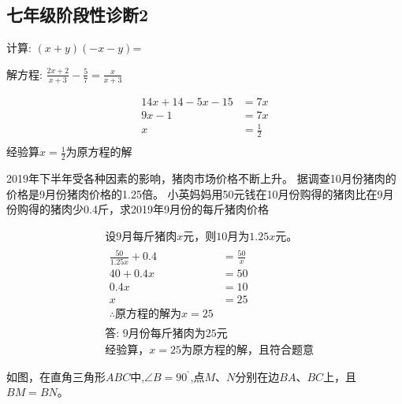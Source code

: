 \documentclass[answers]{exam}
\newcommand\epart{\part}
\newcommand\degree{^\circ}
\begin{document}
\subsection{七年级阶段性诊断2}

\begin{questions}

\question
计算: $(x+y)(-x-y)$=\fillin[$-x^2-2xy-y^2$]

\question
解方程: $\frac{2x+2}{x+3}-\frac{5}{7}=\frac{x}{x+3}$

\begin{solution}
\[
\begin{aligned}
  14x+14-5x-15 &= 7x \\
  9x - 1 &= 7x \\
  x &= \frac{1}{2} \\
\end{aligned}
\]
经验算$x = \frac{1}{2}$为原方程的解
\end{solution}

\question
2019年下半年受各种因素的影响，猪肉市场价格不断上升。
据调查10月份猪肉的价格是9月份猪肉价格的1.25倍。
小英妈妈用50元钱在10月份购得的猪肉比在9月份购得的猪肉少0.4斤，求2019年9月份的每斤猪肉价格

\begin{solution}
  \[
\begin{aligned}
  & \mbox{设9月每斤猪肉$x$元，则10月为$1.25x$元。} \\
  & \begin{aligned}
  \frac{50}{1.25x}+0.4 &= \frac{50}{x} \\
  40 + 0.4x &= 50 \\
  0.4x &= 10 \\
  x &= 25 \\
  \therefore \mbox{原方程的解为} x = 25
  \end{aligned} \\
  & \mbox{答: 9月份每斤猪肉为25元} \\
  & \mbox{经验算，}x=25\mbox{为原方程的解，且符合题意}
\end{aligned}
\]
\end{solution}

\question 
如图，在直角三角形$ABC$中,$\angle B=90^{\degree}$,点$M$、$N$分别在边$BA$、$BC$上，且$BM=BN$。
  


\end{questions}
\end{document}
